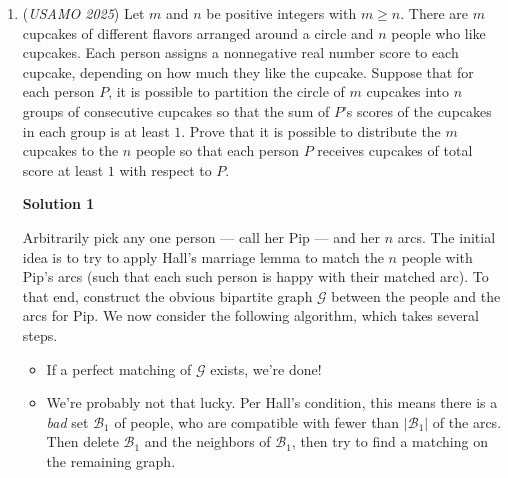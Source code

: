 \begin{enumerate}
 But the left side $(n+1)\,|X/C_{n+1}|\equiv0\pmod{n+1}$, so  
 \[n+1\;\bigm\vert\;\sum_{i=0}^n\binom{n+1}{i}^{2m}.\]

 A re‐index $n+1\mapsto n$ yields  
 \[n+1\;\bigm\vert\;\sum_{i=0}^n\binom{n}{i}^{2m},\]hence  
 \[A_{2m}(n)=\frac1{n+1}\sum_{i=0}^n\binom{n}{i}^{2m}\in\mathbb Z.\]

 Case 2: $k$ odd  

 Take $n=2$.  Then  
 \[A_k(2)=\frac{\binom21^k+\binom22^k+\binom23^k}{3} =\frac{1+2^k+1}{3} =\frac{2+2^k}{3}.\]

 If $k$ is odd then $2^k\equiv2\pmod3$, so $2+2^k\equiv4\equiv1\pmod3$, whence  
 \[A_k(2)\notin\mathbb Z.\]

 Conclusion  

 $A_k(n)\in\mathbb Z\text{ for all }n\ge1\iff k\text{ even.}$



	\item (\textit{USAMO 2025}) Let $m$ and $n$ be positive integers with $m\geq n$. There are $m$ cupcakes of different flavors arranged around a circle and $n$ people who like cupcakes. Each person assigns a nonnegative real number score to each cupcake, depending on how much they like the cupcake. Suppose that for each person $P$, it is possible to partition the circle of $m$ cupcakes into $n$ groups of consecutive cupcakes so that the sum of $P$'s scores of the cupcakes in each group is at least $1$. Prove that it is possible to distribute the $m$ cupcakes to the $n$ people so that each person $P$ receives cupcakes of total score at least $1$ with respect to $P$.


 



\textbf{Solution 1}

Arbitrarily pick any one person — call her Pip — and her $n$ arcs. The initial idea is to try to apply Hall’s marriage lemma to match the $n$ people with Pip’s arcs (such that each such person is happy with their matched arc). To that end, construct the obvious bipartite graph $\mathcal{G}$ between the people and the arcs for Pip. We now consider the following algorithm, which takes several steps.  

 
            \begin{itemize}
        \item If a perfect matching of $\mathcal{G}$ exists, we’re done!
            \end{itemize}
            
            \begin{itemize}
        \item We’re probably not that lucky. Per Hall’s condition, this means there is a \textit{bad} set $\mathcal{B}_1$ of people, who are compatible with fewer than $|\mathcal{B}_1|$ of the arcs. Then delete $\mathcal{B}_1$ and the neighbors of $\mathcal{B}_1$, then try to find a matching on the remaining graph.
            \end{itemize}
            

\end{enumerate}

